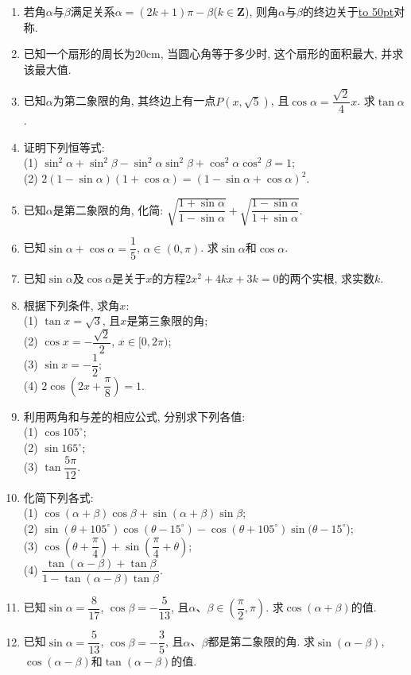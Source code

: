 \documentclass[10pt,a4paper]{article}
\newcommand{\blank}[1]{\underline{\hbox to #1pt{}}}
\begin{document}
\begin{enumerate}[1.]
\item 若角$\alpha$与$\beta$满足关系$\alpha=(2k+1)\pi -\beta$($k\in\mathbf{Z}$), 则角$\alpha$与$\beta$的终边关于\blank{50}对称. \item 已知一个扇形的周长为$20\text{cm}$, 当圆心角等于多少时, 这个扇形的面积最大, 并求该最大值.
\item 已知$\alpha$为第二象限的角, 其终边上有一点$P(x, \sqrt 5)$, 且$\cos \alpha=\dfrac{\sqrt 2}4x$. 求$\tan \alpha$.
\item 证明下列恒等式:\\
(1) $\sin^2\alpha+\sin^2\beta-\sin^2\alpha\sin^2\beta+\cos^2\alpha\cos^2\beta=1$;\\
(2) $2(1-\sin \alpha)(1+\cos \alpha)=(1-\sin \alpha+\cos\alpha)^2$.
\item 已知$\alpha$是第二象限的角, 化简: $\sqrt{\dfrac{1+\sin \alpha}{1-\sin \alpha}}+\sqrt{\dfrac{1-\sin\alpha}{1+\sin\alpha}}$.
\item 已知$\sin \alpha+\cos \alpha=\dfrac 15$, $\alpha\in (0, \pi)$. 求$\sin \alpha$和$\cos \alpha$.
\item 已知$\sin \alpha$及$\cos \alpha$是关于$x$的方程$2x^2+4kx+3k=0$的两个实根, 求实数$k$.
\item 根据下列条件, 求角$x$:\\
(1) $\tan x=\sqrt 3$, 且$x$是第三象限的角;\\
(2) $\cos x=-\dfrac{\sqrt 2}2$, $x\in [0, 2\pi)$;\\
(3) $\sin x=-\dfrac 12$;\\
(4) $2\cos (2x+\dfrac \pi 8)=1$.
\item 利用两角和与差的相应公式, 分别求下列各值:\\
(1) $\cos 105^\circ$;\\
(2) $\sin 165^\circ$;\\
(3) $\tan \dfrac{5\pi}{12}$.
\item 化简下列各式:\\
(1) $\cos (\alpha+\beta)\cos \beta+\sin (\alpha+\beta)\sin\beta$;\\
(2) $\sin (\theta +105^\circ)\cos (\theta -15^\circ )-\cos (\theta +105^\circ )\sin (\theta -15^\circ$);\\
(3) $\cos (\theta +\dfrac \pi 4)+\sin (\dfrac \pi 4+\theta)$;\\
(4) $\dfrac{\tan (\alpha-\beta)+\tan \beta}{1-\tan (\alpha-\beta)\tan\beta}$.
\item 已知$\sin \alpha=\dfrac8{17}$, $\cos \beta=-\dfrac 5{13}$, 且$\alpha$、$\beta\in (\dfrac \pi 2, \pi)$. 求$\cos (\alpha+\beta)$的值.
\item 已知$\sin \alpha=\dfrac 5{13}$, $\cos \beta=-\dfrac 35$, 且$\alpha$、$\beta$都是第二象限的角. 求$\sin (\alpha-\beta)$, $\cos (\alpha-\beta)$和$\tan (\alpha-\beta)$的值.

\end{enumerate}
\end{document}
